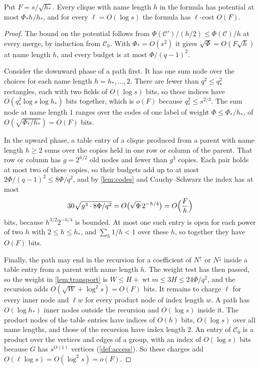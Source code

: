 \documentclass[11pt]{article}
\theoremstyle{definition}
\theoremstyle{definition}
\theoremstyle{remark}
\newcommand{\wt}{\operatorname{wt}}
\newcommand{\Nup}{N^{\uparrow}}
\newcommand{\Ndown}{N^{\downarrow}}
\begin{document}
\begin{lemma}\label{lem:paths}
Put $F=s/\sqrt{h_*}$. Every clique with name length $h$ in the formula has potential at most $\Phi_*h/h_*$, and for every $\ell=O(\log s)$ the formula has $\ell$-cost $O(F)$.
\end{lemma}

\begin{proof}
The bound on the potential follows from $\Phi(\mathcal C')/(h/2)\le\Phi(\mathcal C)/h$ at every merge, by induction from $\mathcal C_0$. With $\Phi_*=O(s^2)$ it gives $\sqrt\Phi=O(F\sqrt h)$ at name length $h$, and every budget is at most $\Phi/(q-1)^2$.

Consider the downward phase of a path first. It has one sum node over the choices for each name length $h=h_*,\dots,2$. There are fewer than $q^2\le q_*^2$ rectangles, each with two fields of $O(\log s)$ bits, so these indices have $O(q_*^2\log s\log h_*)$ bits together, which is $o(F)$ because $q_*^2\le s^{2/3}$. The sum node at name length $1$ ranges over the codes of one label of weight $\Phi\le\Phi_*/h_*$, of $O(\sqrt{\Phi_*/h_*})=O(F)$ bits.

In the upward phase, a table entry of a clique produced from a parent with name length $h\ge2$ sums over the copies held in one row or column of the parent. That row or column has $g=2^{h/2}$ old nodes and fewer than $g^3$ copies. Each pair holds at most two of these copies, so their budgets add up to at most $2\Phi/(q-1)^2\le8\Phi/q^2$, and by \cref{lem:codes} and Cauchy--Schwarz the index has at most
\[
30\sqrt{g^3\cdot8\Phi/q^2}=O\bigl(\sqrt\Phi\,2^{-h/4}\bigr)=O\Bigl(\frac Fh\Bigr)
\]
bits, because $h^{3/2}2^{-h/4}$ is bounded. At most one such entry is open for each power of two $h$ with $2\le h\le h_*$, and $\sum_h1/h<1$ over these $h$, so together they have $O(F)$ bits.

Finally, the path may end in the recursion for a coefficient of $\Nup$ or $\Ndown$ inside a table entry from a parent with name length $h$. The weight test has then passed, so the weight in \cref{lem:transport} is $W\le H+\wt m\le3H\le24\Phi/q^2$, and the recursion adds $O(\sqrt W+\log^2s)=O(F)$ bits. It remains to charge $\ell$ for every inner node and $\ell w$ for every product node of index length $w$. A path has $O(\log h_*)$ inner nodes outside the recursion and $O(\log s)$ inside it. The product nodes of the table entries have indices of $O(h)$ bits, $O(\log s)$ over all name lengths, and those of the recursion have index length $2$. An entry of $\mathcal C_0$ is a product over the vertices and edges of a group, with an index of $O(\log s)$ bits because $G$ has $s^{O(1)}$ vertices (\cref{def:access}). So these charges add $O(\ell\log s)=O(\log^2s)=o(F)$.
\end{proof}
\end{document}
